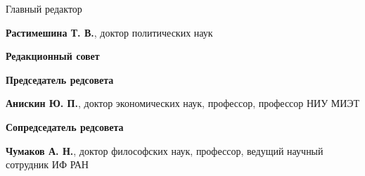 


\begin{center}
    Главный редактор

    \textbf{Растимешина Т. В.}, {доктор политических наук}
\end{center}

\noindent
\begin{minipage}[t]{.48\textwidth}
    \begin{flushleft}
        \footnotesize

\begin{center}
    \textbf{Редакционный совет}
\end{center}


\textbf{Председатель редсовета}

\textbf{Анискин Ю. П.}, доктор экономических наук,
профессор, профессор НИУ МИЭТ

\vspace{1em}
\textbf{Сопредседатель редсовета}

\textbf{Чумаков А. Н.}, доктор философских наук, профессор,
ведущий научный сотрудник ИФ РАН



\end{flushleft}
\end{minipage}
